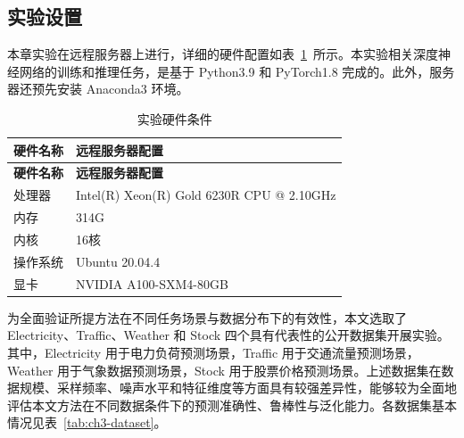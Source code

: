 \subsection{实验设置}\label{ux5b9eux9a8cux8bbeux7f6e}


本章实验在远程服务器上进行，详细的硬件配置如表~\ref{tab:ch3-hardware}~所示。本实验相关深度神经网络的训练和推理任务，是基于 Python3.9 和 PyTorch1.8 完成的。此外，服务器还预先安装 Anaconda3 环境。

\begin{longtable}[]{@{}
  >{\centering\arraybackslash}p{}
  >{\centering\arraybackslash}p{}@{}}
\caption{实验硬件条件}\label{tab:ch3-hardware}\tabularnewline
\toprule\noalign{}
\textbf{硬件名称} & \textbf{远程服务器配置} \\
\midrule\noalign{}
\endfirsthead
\toprule\noalign{}
\textbf{硬件名称} & \textbf{远程服务器配置} \\
\midrule\noalign{}
\endhead
\bottomrule\noalign{}
\endlastfoot
处理器 & Intel(R) Xeon(R) Gold 6230R CPU @ 2.10GHz \\
内存 & 314G \\
内核 & 16核 \\
操作系统 & Ubuntu 20.04.4 \\
显卡 & NVIDIA A100-SXM4-80GB \\
\end{longtable}


为全面验证所提方法在不同任务场景与数据分布下的有效性，本文选取了
Electricity、Traffic、Weather 和 Stock
四个具有代表性的公开数据集开展实验。其中，Electricity
用于电力负荷预测场景，Traffic 用于交通流量预测场景，Weather
用于气象数据预测场景，Stock
用于股票价格预测场景。上述数据集在数据规模、采样频率、噪声水平和特征维度等方面具有较强差异性，能够较为全面地评估本文方法在不同数据条件下的预测准确性、鲁棒性与泛化能力。各数据集基本情况见表~\ref{tab:ch3-dataset}。

